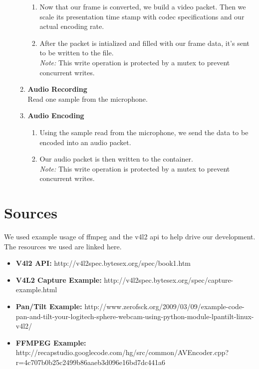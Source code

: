 \documentclass[a4paper]{article}
\begin{document}
\begin{enumerate}
\begin{enumerate}
\begin{enumerate}
				\item Now that our frame is converted, we build a video packet. Then we scale its presentation time stamp with codec specifications and our actual encoding rate.
				\item After the packet is intialized and filled with our frame data, it's sent to be written to the file. 
						\\\textit{Note:} This write operation is protected by a mutex to prevent concurrent writes.
			\end{enumerate}
		\item \textbf{Audio Recording}
			\\  Read one sample from the microphone.
		\item \textbf{Audio Encoding}
			\begin{enumerate}
				\item {} Using the sample read from the microphone, we send the data to be encoded into an audio packet. 
				\item {} Our audio packet is then written to the container.
						\\\textit{Note:} This write operation is protected by a mutex to prevent concurrent writes.
			\end{enumerate}
	\end{enumerate}


\end{enumerate}

\section{Sources}
\begin{description}
	\item We used example usage of ffmpeg and the v4l2 api to help drive our development. The resources we used are linked here.
\end{description}
\begin{itemize}
	\item \textbf{V4l2 API:} http://v4l2spec.bytesex.org/spec/book1.htm
	\item \textbf{V4L2 Capture Example:} http://v4l2spec.bytesex.org/spec/capture-example.html
	\item \textbf{Pan/Tilt Example:} http://www.zerofsck.org/2009/03/09/example-code-pan-and-tilt-your-logitech-sphere-webcam-using-python-module-lpantilt-linux-v4l2/
	\item \textbf{FFMPEG Example:} http://recapstudio.googlecode.com/hg/src/common/AVEncoder.cpp?r=4c707b0b25c2499b86aaeb3d096e16bd7dc441a6
\end{itemize}
\end{document}
